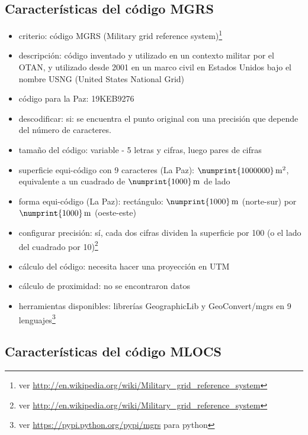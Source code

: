 \documentclass[letterpaper]{article}
\begin{document}
\subsection{Características del código MGRS}

\begin{itemize}
	\item criterio: código MGRS (Military grid reference system)\footnote{ver 
		\url{http://en.wikipedia.org/wiki/Military_grid_reference_system}} 
	\item descripción: código inventado y utilizado en un contexto
		militar por el OTAN, y utilizado desde 2001 en un marco civil en
		Estados Unidos bajo el nombre USNG (United States National Grid)
	\item código para la Paz: 19KEB9276 
	\item descodificar: si: se encuentra el punto original con una 
		precisión que depende del número de caracteres. 
	\item tamaño del código: variable - 5 letras y cifras, luego pares
		de cifras 
	\item superficie equi-código con 9 caracteres (La Paz): 
		\(\numprint{1000000}\,\mathrm{m^{2}}\), 
		equivalente a un cuadrado de \(\numprint{1000}\,\mathrm{m}\) de lado 
	\item forma equi-código (La Paz): rectángulo: 
		\(\numprint{1000}\,\mathrm{m}\) (norte-sur) por 
		\(\numprint{1000}\,\mathrm{m}\) (oeste-este) 
	\item configurar precisión: sí, cada dos 
		cifras dividen la superficie por 100 (o el lado del cuadrado 
		por 10)\footnote{ver 
		\url{http://en.wikipedia.org/wiki/Military_grid_reference_system}} 
	\item cálculo del código: necesita hacer una proyección en UTM 
	\item cálculo de proximidad: no se encontraron datos 
	\item herramientas disponibles: librerías GeographicLib y 
		GeoConvert/mgrs en 9 lenguajes\footnote{ver 
		\url{https://pypi.python.org/pypi/mgrs} para python} 
\end{itemize}

\subsection{Características del código MLOCS}
\end{document}
